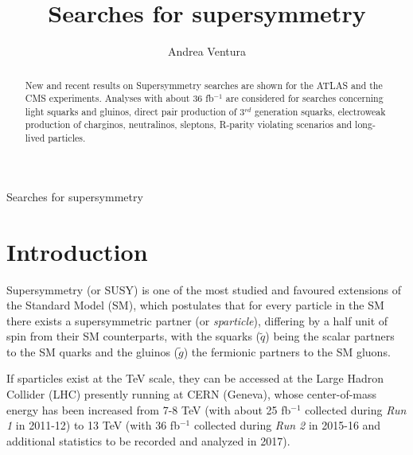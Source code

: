 \documentclass{ws-ijmpcs}
\begin{document}
{Searches for supersymmetry}

%
\catchline{}{}{}{}{}
%

\title{Searches for supersymmetry}

\author{Andrea Ventura}

\address{Dipartimento di Matematica e Fisica ``E. De Giorgi'' dell'Universit\`a del Salento \\ 
\& Sezione di Lecce dell'Istituto Nazionale di Fisica Nucleare\\
Via per Arnesano, Lecce, I-73100, Italy.\\
E-mail: andrea.ventura@le.infn.it\\
\vspace{5mm}
on behalf the ATLAS and CMS Collaborations}

\maketitle

\begin{history}
\end{history}

\begin{abstract}
New and recent results on Supersymmetry searches are shown for the ATLAS and the CMS experiments. Analyses with about 36 fb$^{-1}$ are considered for searches concerning light squarks and gluinos, direct pair production of 3$^{rd}$ generation squarks, electroweak production of charginos, neutralinos, sleptons, R-parity violating scenarios and long-lived particles.
\end{abstract}

\section{Introduction}	
Supersymmetry (or SUSY) \cite{susy1,susy2,susy3,susy4} is one of the most studied and favoured extensions of the Standard Model (SM), which postulates that for every particle in the SM there exists a supersymmetric partner (or {\it sparticle}), differing by a half unit of spin from their SM counterparts, with the squarks ($\tilde{q}$) being the scalar partners to the SM quarks and the gluinos ($\tilde{g}$) the fermionic partners to the SM gluons.

If sparticles exist at the TeV scale, they can be accessed at the Large Hadron Collider (LHC) presently running at CERN (Geneva), whose center-of-mass energy has been increased from 7-8 TeV (with about 25 fb$^{-1}$ collected during {\it Run 1} in 2011-12) to 13 TeV (with 36 fb$^{-1}$ collected during {\it Run 2} in 2015-16 and additional statistics to be recorded and analyzed in 2017).
\end{document}
